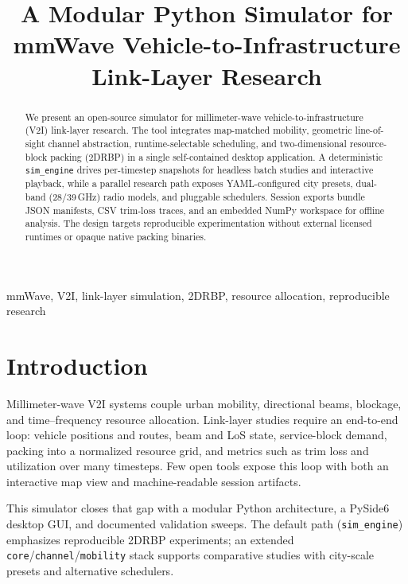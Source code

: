 \documentclass[conference]{IEEEtran}
\title{A Modular Python Simulator for mmWave Vehicle-to-Infrastructure Link-Layer Research}
\author{\IEEEauthorblockN{Ramanathan Subramanian}
\IEEEauthorblockA{subramanian.r@northeastern.edu}}
\begin{document}
\maketitle

\begin{abstract}
We present an open-source simulator for millimeter-wave vehicle-to-infrastructure (V2I) link-layer research.
The tool integrates map-matched mobility, geometric line-of-sight channel abstraction, runtime-selectable scheduling,
and two-dimensional resource-block packing (2DRBP) in a single self-contained desktop application.
A deterministic \texttt{sim\_engine} drives per-timestep snapshots for headless batch studies and interactive playback,
while a parallel research path exposes YAML-configured city presets, dual-band (28/39\,GHz) radio models, and pluggable schedulers.
Session exports bundle JSON manifests, CSV trim-loss traces, and an embedded NumPy workspace for offline analysis.
The design targets reproducible experimentation without external licensed runtimes or opaque native packing binaries.
\end{abstract}

\begin{IEEEkeywords}
mmWave, V2I, link-layer simulation, 2DRBP, resource allocation, reproducible research
\end{IEEEkeywords}

\section{Introduction}
Millimeter-wave V2I systems couple urban mobility, directional beams, blockage, and time--frequency resource allocation.
Link-layer studies require an end-to-end loop: vehicle positions and routes, beam and LoS state, service-block demand,
packing into a normalized resource grid, and metrics such as trim loss and utilization over many timesteps.
Few open tools expose this loop with both an interactive map view and machine-readable session artifacts.

This simulator closes that gap with a modular Python architecture, a PySide6 desktop GUI, and documented validation sweeps.
The default path (\texttt{sim\_engine}) emphasizes reproducible 2DRBP experiments; an extended \texttt{core}/\texttt{channel}/\texttt{mobility} stack supports comparative studies with city-scale presets and alternative schedulers.
\end{document}
